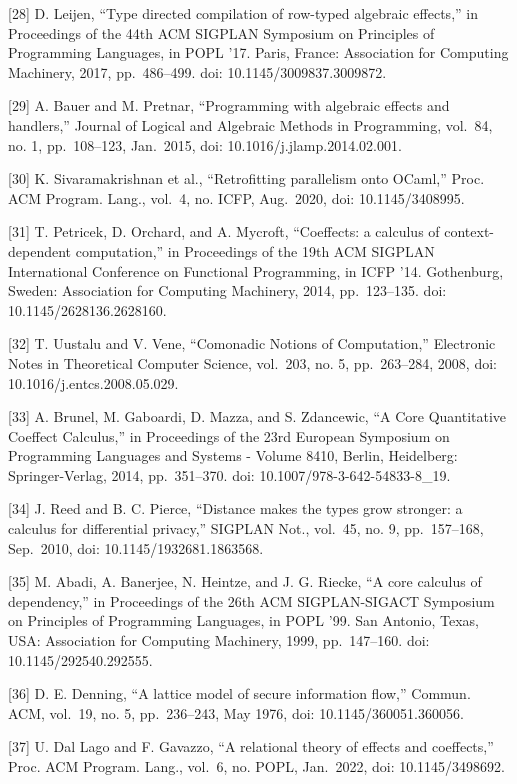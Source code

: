 {[}28{]} D. Leijen, ``Type directed compilation of row-typed algebraic effects,'' in
Proceedings of the 44th ACM SIGPLAN Symposium on Principles of Programming
Languages, in POPL '17. Paris, France: Association for Computing Machinery, 2017,
pp.~486--499. doi: 10.1145/3009837.3009872.

{[}29{]} A. Bauer and M. Pretnar, ``Programming with algebraic effects and handlers,''
Journal of Logical and Algebraic Methods in Programming, vol.~84, no. 1,
pp.~108--123, Jan.~2015, doi: 10.1016/j.jlamp.2014.02.001.

{[}30{]} K. Sivaramakrishnan et al., ``Retrofitting parallelism onto OCaml,'' Proc.
ACM Program. Lang., vol.~4, no. ICFP, Aug.~2020, doi: 10.1145/3408995.

{[}31{]} T. Petricek, D. Orchard, and A. Mycroft, ``Coeffects: a calculus of
context-dependent computation,'' in Proceedings of the 19th ACM SIGPLAN
International Conference on Functional Programming, in ICFP '14. Gothenburg,
Sweden: Association for Computing Machinery, 2014, pp.~123--135. doi:
10.1145/2628136.2628160.

{[}32{]} T. Uustalu and V. Vene, ``Comonadic Notions of Computation,'' Electronic
Notes in Theoretical Computer Science, vol.~203, no. 5, pp.~263--284, 2008, doi:
10.1016/j.entcs.2008.05.029.

{[}33{]} A. Brunel, M. Gaboardi, D. Mazza, and S. Zdancewic, ``A Core Quantitative
Coeffect Calculus,'' in Proceedings of the 23rd European Symposium on Programming
Languages and Systems - Volume 8410, Berlin, Heidelberg: Springer-Verlag, 2014,
pp.~351--370. doi: 10.1007/978-3-642-54833-8\_19.

{[}34{]} J. Reed and B. C. Pierce, ``Distance makes the types grow stronger: a
calculus for differential privacy,'' SIGPLAN Not., vol.~45, no. 9, pp.~157--168,
Sep.~2010, doi: 10.1145/1932681.1863568.

{[}35{]} M. Abadi, A. Banerjee, N. Heintze, and J. G. Riecke, ``A core calculus of
dependency,'' in Proceedings of the 26th ACM SIGPLAN-SIGACT Symposium on
Principles of Programming Languages, in POPL '99. San Antonio, Texas, USA:
Association for Computing Machinery, 1999, pp.~147--160. doi: 10.1145/292540.292555.

{[}36{]} D. E. Denning, ``A lattice model of secure information flow,'' Commun. ACM,
vol.~19, no. 5, pp.~236--243, May 1976, doi: 10.1145/360051.360056.

{[}37{]} U. Dal Lago and F. Gavazzo, ``A relational theory of effects and coeffects,''
Proc. ACM Program. Lang., vol.~6, no. POPL, Jan.~2022, doi: 10.1145/3498692.

